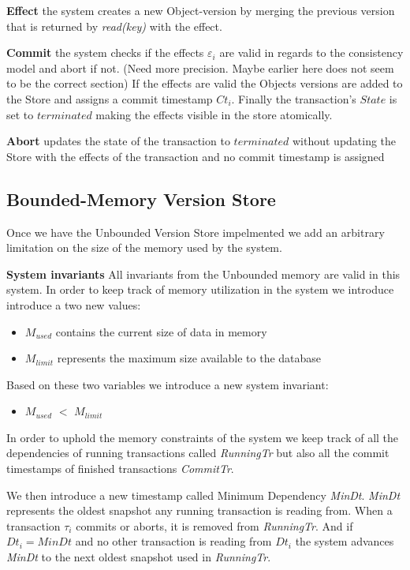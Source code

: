 \documentclass[systeme,french,english]{compas2022}
\begin{document}
\textbf{Effect} the system creates a new Object-version by merging the previous version that is returned by \emph{read(key)} with the effect.

\textbf{Commit} the system checks if the effects $\varepsilon_i$ are valid in regards to the consistency model and abort if not. (Need more precision. Maybe earlier here does not seem to be the correct section)
If the effects are valid the Objects versions are added to the Store and assigns a commit timestamp $Ct_i$.
Finally the transaction's $State$ is set to $terminated$ making the effects visible in the store atomically.

\textbf{Abort} updates the state of the transaction to $terminated$ without updating the Store with the effects of the transaction and no commit timestamp is assigned

\subsection{Bounded-Memory Version Store}

Once we have the Unbounded Version Store impelmented we add an arbitrary limitation on the size of the memory used by the system.

\textbf{System invariants}
All invariants from the Unbounded memory are valid in this system.
In order to keep track of memory utilization in the system we introduce introduce a two new values:
\begin{itemize}
  \item \emph{$M_{used}$} contains the current size of data in memory
  \item \emph{$M_{limit}$} represents the maximum size available to the database
\end{itemize}
Based on these two variables we introduce a new system invariant:
\begin{itemize}
  \item \emph{$M_{used}$} $<$ \emph{$M_{limit}$}
\end{itemize}
In order to uphold the memory constraints of the system we keep track of all the dependencies of running transactions called \emph{RunningTr} but also all the commit timestamps of finished transactions \emph{CommitTr}.

We then introduce a new timestamp called Minimum Dependency \emph{MinDt}.
\emph{MinDt} represents the oldest snapshot any running transaction is reading from.
When a transaction $\tau_i$ commits or aborts, it is removed from \emph{RunningTr}. 
And if $Dt_i = MinDt$ and no other transaction is reading from $Dt_i$ the system advances \emph{MinDt} to the next oldest snapshot used in \emph{RunningTr}.
\end{document}
